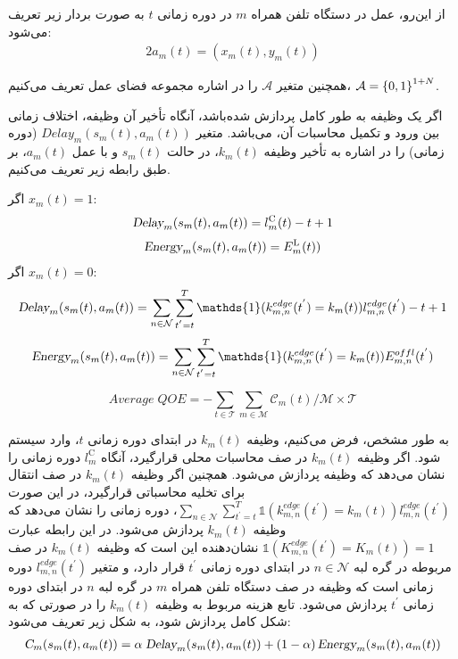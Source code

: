 

از این‌رو، عمل در دستگاه تلفن همراه $m$ در دوره زمانی $t$ به صورت بردار زیر تعریف می‌شود:
\begin{alignat}{2}
	a_m(t) = (x_m(t), y_m(t))
	\label{52}  
\end{alignat}


همچنین متغیر $\mathcal{A}$ را در اشاره مجموعه فضای عمل تعریف می‌کنیم، $\mathcal{A} = \left\{ 0,1 \right\}^{1+N}$. 


اگر یک وظیفه به طور کامل پردازش شده‌باشد، آنگاه تأخیر آن وظیفه، اختلاف زمانی بین ورود و تکمیل محاسبات آن، می‌باشد. متغیر $Delay_m(s_m(t),a_m(t))$ (دوره زمانی) را در اشاره به تأخیر وظیفه $k_m(t)$، در حالت $s_m(t)$ و با عمل $a_m(t)$، بر طبق رابطه زیر تعریف می‌کنیم. 

اگر $x_m(t) = 1$:
\begin{alignat}{2}
	\textsl{Delay}_m(s_m(t),a_m(t)) = l_m^{\text{C}}(t) - t + 1
	\label{53}  
\end{alignat}
\begin{alignat}{2}
	\textsl{Energy}_m(s_m(t),a_m(t)) = E_m^{\text{L}}(t)) 
	\label{54}  
\end{alignat}
اگر $x_m(t) = 0$:
\begin{alignat}{2}
	\textsl{Delay}_m(s_m(t),a_m(t)) = \sum\limits_{n \in \mathcal{N}} \sum\limits_{t^{'}=t}^{T}\mathds{1}(k_{m,n}^{edge}(t^{'}) = k_m(t))l_{m,n}^{edge}(t^{'}) - t +1
	\label{55}  
\end{alignat}
\begin{alignat}{2}
	\textsl{Energy}_m(s_m(t),a_m(t)) = \sum\limits_{n \in \mathcal{N}} \sum\limits_{t^{'}=t}^{T}\mathds{1}(k_{m,n}^{edge}(t^{'}) = k_m(t)) E_{m,n}^{offl}(t^{'}) 
	\label{56}  
\end{alignat}

	$$Average\; QOE= - { \sum_{t \in \mathcal{T}} \sum_{m \in \mathcal{M}} \mathcal{C}_m(t) \big / \mathcal{M} \times \mathcal{T}}$$

به طور مشخص، فرض می‌کنیم، وظیفه $k_m(t)$ در ابتدای دوره زمانی $t$، وارد سیستم شود. اگر وظیفه $k_m(t)$ در صف محاسبات محلی قرارگیرد، آنگاه $l_m^{\text{C}}$ دوره زمانی را نشان می‌دهد که وظیفه پردازش می‌شود. همچنین اگر وظیفه $k_m(t)$ در صف انتقال برای تخلیه محاسباتی قرارگیرد، در این صورت $\sum\limits_{n \in \mathcal{N}} \sum\limits_{t^{'}=t}^{T}\mathds{1}(k_{m,n}^{edge}(t^{'}) = k_m(t))l_{m,n}^{edge}(t^{'})$، دوره زمانی را نشان می‌دهد که وظیفه $k_m(t)$ پردازش می‌شود. در این رابطه عبارت $\mathds{1}(K_{m,n}^{edge}(t^{'}) = K_m(t)) = 1$ نشان‌دهنده این است که وظیفه $k_m(t)$ در صف مربوطه در گره لبه $n \in \mathcal{N}$ در ابتدای دوره زمانی $t^{'}$ قرار دارد، و متغیر $l_{m,n}^{edge}(t^{'})$ دوره زمانی است که وظیفه در صف دستگاه تلفن همراه $m$ در گره لبه $n$ در ابتدای دوره زمانی $t^{'}$ پردازش می‌شود. 
تابع هزینه مربوط به وظیفه $k_m(t)$ را در صورتی که به شکل کامل پردازش شود، به شکل زیر تعریف می‌شود:
\begin{alignat}{2}
	 \textsl{C}_m(s_m(t),a_m(t)) = \alpha \; \textsl{Delay}_m(s_m(t),a_m(t))  +  (1-\alpha) \, \textsl{Energy}_m(s_m(t),a_m(t)) 
	\label{57}  
\end{alignat}


